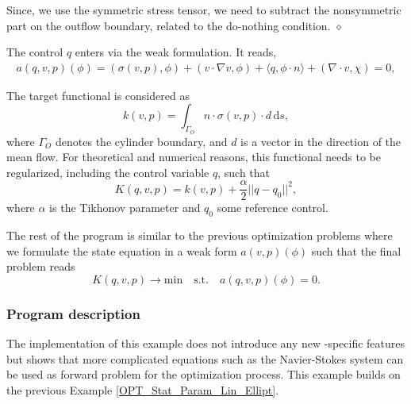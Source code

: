 \begin{remark} Since, we use the 
symmetric stress tensor, we need to subtract the nonsymmetric part 
on the outflow boundary, related to the do-nothing condition.
$\diamond$
\end{remark}

The control $q$ enters via the weak formulation. It reads,
\begin{align*}
a(q,v,p)(\phi) = (\sigma(v,p), \phi) + (v\cdot \nabla v, \phi) 
+ \langle q, \phi\cdot n \rangle + (\nabla\cdot v, \chi) = 0,
\end{align*}




The target functional is considered as 
\[
k(v,p) = \int_{\Gamma_O} n\cdot \sigma(v,p)\cdot d \, \mathrm{d}s,
\]
where $\Gamma_O$ denotes the cylinder boundary, and $d$ is a vector in the
direction
of the mean flow. For theoretical and numerical reasons, this functional 
needs to be regularized, including the control variable $q$, such that
\[
K(q,v,p) = k(v,p) + \frac{\alpha}{2}||q - q_0||^2,
\] 
where $\alpha$ is the Tikhonov parameter and $q_0$ some 
reference control. 

The rest of the program is similar to the previous optimization problems where
we formulate the state equation in a weak form $a(v,p)(\phi)$ such that the 
final problem reads
\[
K(q,v,p) \rightarrow \text{min} \quad \text{s.t.} \quad a(q,v,p)(\phi) = 0.
\]


\subsubsection{Program description}
The implementation of this example does not introduce any new \dope{}-specific
features but shows that more complicated equations such as the Navier-Stokes 
system can be used as forward problem for the optimization process. 
This example builds on the previous Example \ref{OPT_Stat_Param_Lin_Ellipt}.

